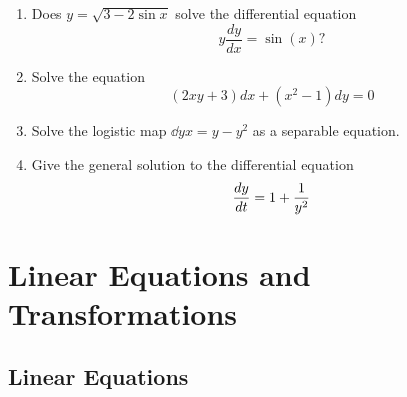 \documentclass[12pt]{book}
\begin{document}
\begin{enumerate}
\item
  Does $y = \sqrt{3-2\sin x}$ solve the differential equation
  \begin{dmath*}
    y\frac{dy}{dx}=\sin(x)?
  \end{dmath*}

\item
  Solve the equation
  \begin{dmath*}
    (2xy + 3) dx + (x^2 - 1) dy = 0
  \end{dmath*}

\item
  Solve the logistic map $\dd{y}{x} = y - y^2$ as a separable equation.

\item
  Give the general solution to the differential equation
  \begin{dmath*}
    \ddt{y} = 1 + \frac{1}{y^2}
  \end{dmath*}

\end{enumerate}



\chapter{Linear Equations and Transformations}

\section{Linear Equations}
\end{document}
